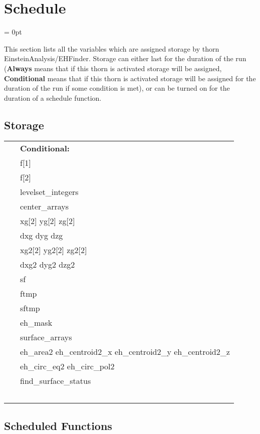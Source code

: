 
\section{Schedule} 


\parskip = 0pt


\noindent This section lists all the variables which are assigned storage by thorn EinsteinAnalysis/EHFinder.  Storage can either last for the duration of the run ({\bf Always} means that if this thorn is activated storage will be assigned, {\bf Conditional} means that if this thorn is activated storage will be assigned for the duration of the run if some condition is met), or can be turned on for the duration of a schedule function.


\subsection*{Storage}

\hspace{5mm}

 \begin{tabular*}{160mm}{ll} 
~& {\bf Conditional:} \\ 
~ &  f[1]\\ 
~ &  f[2]\\ 
~ &  levelset\_integers\\ 
~ &  center\_arrays\\ 
~ &  xg[2] yg[2] zg[2]\\ 
~ &  dxg dyg dzg\\ 
~ &  xg2[2] yg2[2] zg2[2]\\ 
~ &  dxg2 dyg2 dzg2\\ 
~ &  sf\\ 
~ &  ftmp\\ 
~ &  sftmp\\ 
~ &  eh\_mask\\ 
~ &  surface\_arrays\\ 
~ &  eh\_area2 eh\_centroid2\_x eh\_centroid2\_y eh\_centroid2\_z\\ 
~ &  eh\_circ\_eq2 eh\_circ\_pol2\\ 
~ &  find\_surface\_status\\ 
~ & ~\\ 
\end{tabular*} 


\subsection*{Scheduled Functions}
\vspace{5mm}

